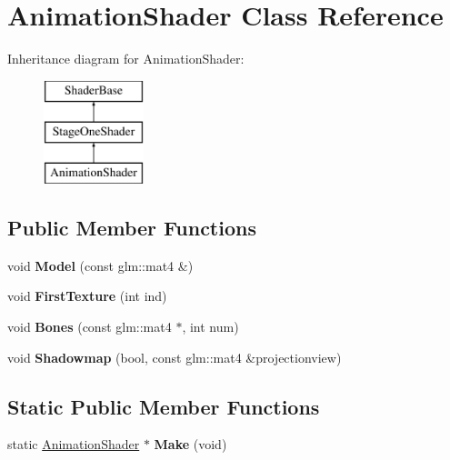 \hypertarget{classAnimationShader}{\section{\-Animation\-Shader \-Class \-Reference}
\label{classAnimationShader}
}
\-Inheritance diagram for \-Animation\-Shader\-:\begin{figure}[H]
\begin{center}
\leavevmode
\includegraphics[height=3.000000cm]{classAnimationShader}
\end{center}
\end{figure}
\subsection*{\-Public \-Member \-Functions}
\begin{DoxyCompactItemize}
\item 
\hypertarget{classAnimationShader_a85dd995b06f01e670aee22620c3a9b08}{void {\bfseries \-Model} (const glm\-::mat4 \&)}\label{classAnimationShader_a85dd995b06f01e670aee22620c3a9b08}

\item 
\hypertarget{classAnimationShader_a59a7f87f0053b089061c0bed48e345c7}{void {\bfseries \-First\-Texture} (int ind)}\label{classAnimationShader_a59a7f87f0053b089061c0bed48e345c7}

\item 
\hypertarget{classAnimationShader_a55d021f0f433d680aede9f99eacfa115}{void {\bfseries \-Bones} (const glm\-::mat4 $\ast$, int num)}\label{classAnimationShader_a55d021f0f433d680aede9f99eacfa115}

\item 
\hypertarget{classAnimationShader_af1f2572a6bec7e5661b6e06d18f0fd1f}{void {\bfseries \-Shadowmap} (bool, const glm\-::mat4 \&projectionview)}\label{classAnimationShader_af1f2572a6bec7e5661b6e06d18f0fd1f}

\end{DoxyCompactItemize}
\subsection*{\-Static \-Public \-Member \-Functions}
\begin{DoxyCompactItemize}
\item 
\hypertarget{classAnimationShader_a16df5c606b4cbad58d1bfbbc9a2d8a31}{static \hyperlink{classAnimationShader}{\-Animation\-Shader} $\ast$ {\bfseries \-Make} (void)}\label{classAnimationShader_a16df5c606b4cbad58d1bfbbc9a2d8a31}

\end{DoxyCompactItemize}
